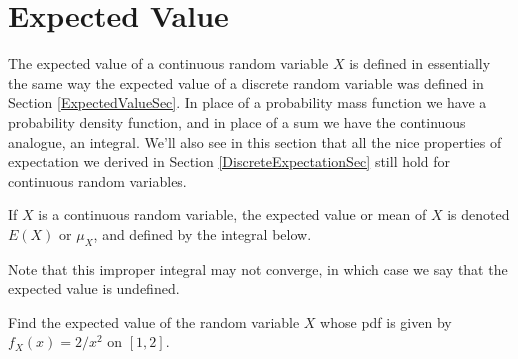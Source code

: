 \section{Expected Value}\label{ContinuousExpectedSec}

The expected value of a continuous random variable $X$ is defined in essentially the same way the expected value of a discrete random variable was defined in Section \ref{ExpectedValueSec}. In place of a probability mass function we have a probability density function, and in place of a sum we have the continuous analogue, an integral. We'll also see in this section that all the nice properties of expectation we derived in Section \ref{DiscreteExpectationSec} still hold for continuous random variables.

\begin{defn}
If $X$ is a continuous random variable, the expected value or mean of $X$ is denoted $E(X)$ or $\mu_X$, and defined by the integral below.
\par
\noindent Note that this improper integral may not converge, in which case we say that the expected value is undefined.
\end{defn}

\begin{examp}Find the expected value of the random variable $X$ whose pdf is given by $f_X(x) = 2/x^2$ on $[1,2]$.
\end{examp}

